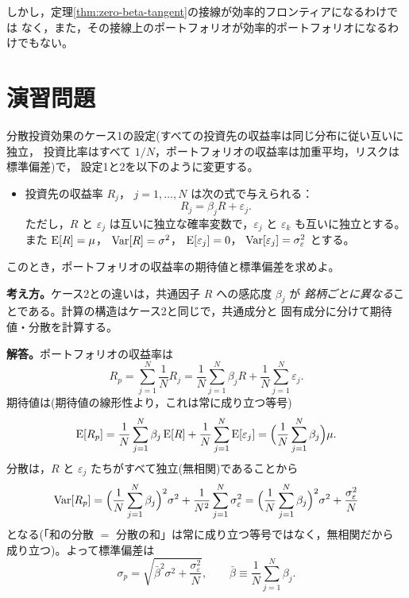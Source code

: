 \begin{remark}
しかし，定理\ref{thm:zero-beta-tangent}の接線が効率的フロンティアになるわけでは
なく，また，その接線上のポートフォリオが効率的ポートフォリオになるわけでもない。
\end{remark}

\section{演習問題}

\begin{exercise}[問題1]
分散投資効果のケース1の設定(すべての投資先の収益率は同じ分布に従い互いに独立，
投資比率はすべて $1/N$，ポートフォリオの収益率は加重平均，リスクは標準偏差)で，
設定1と2を以下のように変更する。
\begin{itemize}
\item[1''.] 投資先の収益率 $R_j$， $j=1,\dots,N$ は次の式で与えられる：
\[
R_j = \beta_j R + \varepsilon_j.
\]
ただし，$R$ と $\varepsilon_j$ は互いに独立な確率変数で，$\varepsilon_j$ と
$\varepsilon_k$ も互いに独立とする。また
$\mathrm{E}[R]=\mu$， $\mathrm{Var}[R]=\sigma^2$， $\mathrm{E}[\varepsilon_j]=0$，
$\mathrm{Var}[\varepsilon_j]=\sigma_\varepsilon^2$ とする。
\end{itemize}
このとき，ポートフォリオの収益率の期待値と標準偏差を求めよ。
\end{exercise}

\begin{answerbox}
\textbf{考え方。}ケース2との違いは，共通因子 $R$ への感応度 $\beta_j$ が
\emph{銘柄ごとに異なる}ことである。計算の構造はケース2と同じで，共通成分と
固有成分に分けて期待値・分散を計算する。

\medskip
\textbf{解答。}ポートフォリオの収益率は
\[
R_p = \sum_{j=1}^{N}\frac{1}{N}R_j
= \frac{1}{N}\sum_{j=1}^{N}\beta_j R + \frac{1}{N}\sum_{j=1}^{N}\varepsilon_j.
\]
期待値は(期待値の線形性より，これは常に成り立つ等号)
\[
\mathrm{E}[R_p] = \frac{1}{N}\sum_{j=1}^{N}\beta_j\,\mathrm{E}[R]
+ \frac{1}{N}\sum_{j=1}^{N}\mathrm{E}[\varepsilon_j]
= \Bigl(\frac{1}{N}\sum_{j=1}^{N}\beta_j\Bigr)\mu.
\]
分散は，$R$ と $\varepsilon_j$ たちがすべて独立(無相関)であることから
\[
\mathrm{Var}[R_p] = \Bigl(\frac{1}{N}\sum_{j=1}^{N}\beta_j\Bigr)^2\sigma^2
+ \frac{1}{N^2}\sum_{j=1}^{N}\sigma_\varepsilon^2
= \Bigl(\frac{1}{N}\sum_{j=1}^{N}\beta_j\Bigr)^2\sigma^2
+ \frac{\sigma_\varepsilon^2}{N}
\]
となる(「和の分散 $=$ 分散の和」は常に成り立つ等号ではなく，無相関だから
成り立つ)。よって標準偏差は
\[
\sigma_p = \sqrt{\bar\beta^2\sigma^2 + \frac{\sigma_\varepsilon^2}{N}},
\qquad
\bar\beta \equiv \frac{1}{N}\sum_{j=1}^{N}\beta_j.
\]
\end{answerbox}

